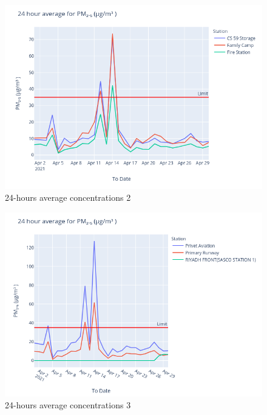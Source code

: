\documentclass[12pt, oneside]{book}
\begin{document}
{
{\begin{figure}[H]
\centering
\includegraphics[width=\textwidth]{image198}
\caption{24-hours average  concentrations 2}\label{image198}
\end{figure}}{}


{\begin{figure}[H]
\centering
\includegraphics[width=\textwidth]{image210}
\caption{24-hours average  concentrations 3}\label{image210}
\end{figure}}{}


}
\end{document}
